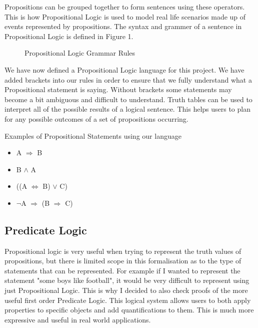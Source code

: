 Propositions can be grouped together to form sentences using these operators. This is how Propositional Logic is used to model real life scenarios made up of events represented by propositions. The syntax and grammer of a sentence in Propositional Logic is defined in Figure 1.

\begin{figure}[!ht]
  \centering
  \caption{Propositional Logic Grammar Rules}
\end{figure}
\pagebreak
We have now defined a Propositional Logic language for this project. We have added brackets into our rules in order to ensure that we fully understand what a Propositional statement is saying. Without brackets some statements may become a bit ambiguous and difficult to understand. Truth tables can be used to interpret all of the possible results of a logical sentence. This helps users to plan for any possible outcomes of a set of propositions occurring.

\begin{exmp}Examples of Propositional Statements using our language
\begin{itemize}
\item A $\Rightarrow$ B
\item B $\wedge$ A
\item ((A $\Leftrightarrow$ B) $\vee$ C)
\item $\neg$A $\Rightarrow$ (B $\Rightarrow$ C)
\end{itemize}
\end{exmp}


\subsection{Predicate Logic}
Propositional logic is very useful when trying to represent the truth values of propositions, but there is limited scope in this formalisation as to the type of statements that can be represented. For example if I wanted to represent the statement "some boys like football", it would be very difficult to represent using just Propositional Logic. This is why I decided to also check proofs of the more useful first order Predicate Logic. This logical system allows users to both apply properties to specific objects and add quantifications to them. This is much more expressive and useful in real world applications. 

